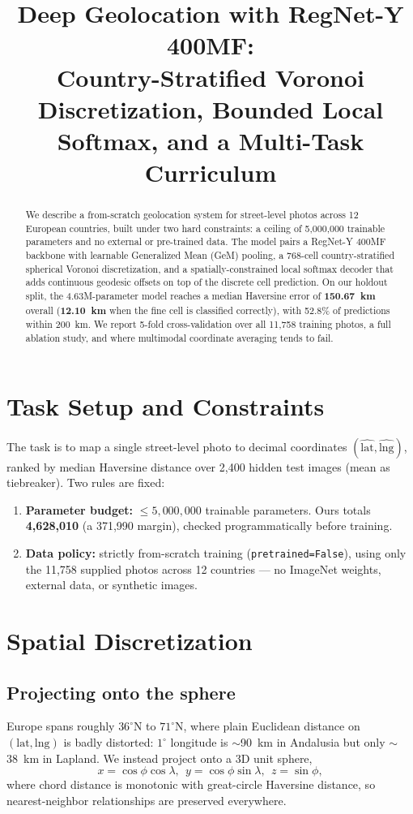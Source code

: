 \documentclass[10pt,twocolumn,a4paper]{article}
\title{\vspace{-1.8cm}\textbf{Deep Geolocation with RegNet-Y 400MF:}\\
\large Country-Stratified Voronoi Discretization, Bounded Local Softmax, and a Multi-Task Curriculum}
\date{\vspace{-0.5cm}}
\begin{document}
\maketitle
\thispagestyle{empty}

\begin{abstract}
We describe a from-scratch geolocation system for street-level photos across 12 European countries, built under two hard constraints: a ceiling of 5{,}000{,}000 trainable parameters and no external or pre-trained data. The model pairs a RegNet-Y 400MF backbone with learnable Generalized Mean (GeM) pooling, a 768-cell country-stratified spherical Voronoi discretization, and a spatially-constrained local softmax decoder that adds continuous geodesic offsets on top of the discrete cell prediction. On our holdout split, the 4.63M-parameter model reaches a median Haversine error of \textbf{150.67~km} overall (\textbf{12.10~km} when the fine cell is classified correctly), with 52.8\% of predictions within 200~km. We report 5-fold cross-validation over all 11{,}758 training photos, a full ablation study, and where multimodal coordinate averaging tends to fail.
\end{abstract}

\section{Task Setup and Constraints}
The task is to map a single street-level photo to decimal coordinates $(\hat{\text{lat}}, \hat{\text{lng}})$, ranked by median Haversine distance over 2{,}400 hidden test images (mean as tiebreaker). Two rules are fixed:
\begin{enumerate}
    \item \textbf{Parameter budget:} $\le 5{,}000{,}000$ trainable parameters. Ours totals \textbf{4{,}628{,}010} (a 371{,}990 margin), checked programmatically before training.
    \item \textbf{Data policy:} strictly from-scratch training (\texttt{pretrained=False}), using only the 11{,}758 supplied photos across 12 countries — no ImageNet weights, external data, or synthetic images.
\end{enumerate}

\section{Spatial Discretization}
\subsection{Projecting onto the sphere}
Europe spans roughly $36^\circ$N to $71^\circ$N, where plain Euclidean distance on $(\text{lat},\text{lng})$ is badly distorted: $1^\circ$ longitude is $\sim$90~km in Andalusia but only $\sim$38~km in Lapland. We instead project onto a 3D unit sphere,
\begin{equation}
x = \cos\phi\cos\lambda,\ \ y = \cos\phi\sin\lambda,\ \ z = \sin\phi,
\end{equation}
where chord distance is monotonic with great-circle Haversine distance, so nearest-neighbor relationships are preserved everywhere.
\end{document}
